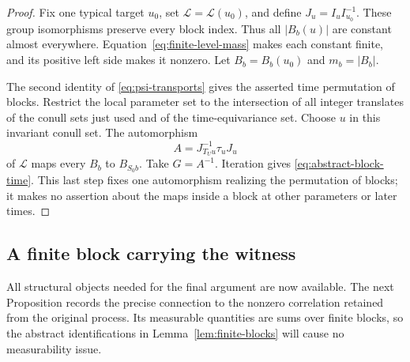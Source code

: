 \begin{proof}
Fix one typical target $u_0$, set $\mathcal L=\mathcal L(u_0)$,
and define $J_u=I_uI_{u_0}^{-1}$. These group isomorphisms preserve
every block index. Thus all $|B_b(u)|$ are constant almost everywhere.
Equation~\eqref{eq:finite-level-mass} makes each constant finite,
and its positive left side makes it nonzero. Let $B_b=B_b(u_0)$
and $m_b=|B_b|$.

The second identity of \eqref{eq:psi-transports} gives the asserted
time permutation of blocks. Restrict the local parameter set to
the intersection of all integer translates of the conull sets just
used and of the time-equivariance set. Choose $u$ in this invariant
conull set. The automorphism
\[
 A=J_{T_Uu}^{-1}\tau_uJ_u
\]
of $\mathcal L$ maps every $B_b$ to $B_{S_0b}$.
Take $G=A^{-1}$. Iteration gives
\eqref{eq:abstract-block-time}. This last step fixes one automorphism
realizing the permutation of blocks; it makes no assertion about
the maps inside a block at other parameters or later times.
\end{proof}

\subsection{A finite block carrying the witness}

All structural objects needed for the final argument are now
available. The next Proposition records the precise connection to
the nonzero correlation retained from the original process. Its
measurable quantities are sums over finite blocks, so the abstract
identifications in Lemma~\ref{lem:finite-blocks} will cause no
measurability issue.

